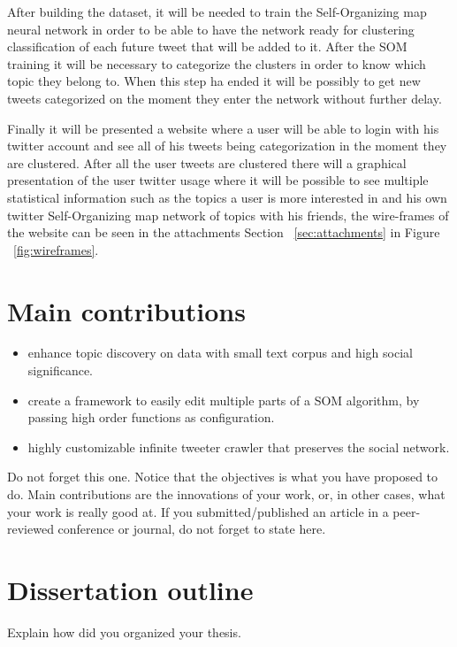 After building the dataset, it will be needed to train the Self-Organizing map neural network in order to be able to have the network ready for clustering classification of each future tweet that will be added to it. After the SOM training it will be necessary to categorize the clusters in order to know which topic they belong to. When this step ha ended it will be possibly to get new tweets categorized on the moment they enter the network without further delay.

Finally it will be presented a website where a user will be able to login with his twitter account and see all of his tweets being categorization in the moment they are clustered. After all the user tweets are clustered there will a graphical presentation of the user twitter usage where it will be possible to see multiple statistical information such as the topics a user is more interested in and his own twitter Self-Organizing map network of topics with his friends, the wire-frames of the website can be seen in the attachments Section ~\ref{sec:attachments} in Figure ~\ref{fig:wireframes}.
 

\section{Main contributions}
\begin{itemize}
  \item enhance topic discovery on data with small text corpus and high social significance.
  \item create a framework to easily edit multiple parts of a SOM algorithm, by passing high order functions as configuration.
  \item highly customizable infinite tweeter crawler that preserves the social network.  
\end{itemize}
Do not forget this one. Notice that the objectives is what you have proposed to do. Main contributions are the innovations of your work, or, in other cases, what your work is really good at. If you submitted/published an article in a peer-reviewed conference or journal, do not forget to state here.

\section{Dissertation outline}
Explain how did you organized your thesis.

\cleardoublepage 
